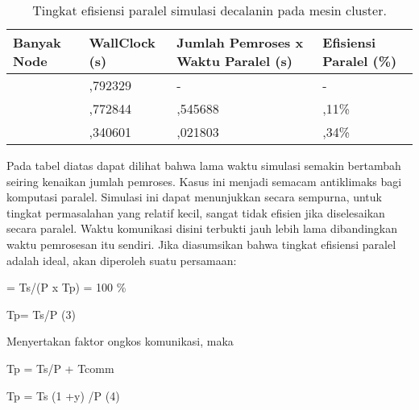 \documentclass[aps,showpacs,pre,floatfix]{revtex4}
\begin{document}
\begin{table}
  \centering


\begin{tabular}{|p{64pt}|p{91pt}|p{91pt}|p{91pt}|}
\hline
\parbox{64pt}{\centering
Banyak Node } & \parbox{91pt}{\centering WallClock (s) } &
\parbox{91pt}{\centering Jumlah Pemroses x Waktu Paralel
(s) } & \parbox{91pt}{\centering Efisiensi Paralel (\%)
} \\
\hline
\parbox{64pt}{
} & \parbox{91pt}{,792329
} & \parbox{91pt}{\centering
-
} & \parbox{91pt}{\centering
-
} \\
\parbox{64pt}{
} & \parbox{91pt}{,772844
} & \parbox{91pt}{,545688
} & \parbox{91pt}{,11\%
} \\
\parbox{64pt}{
} & \parbox{91pt}{,340601
} & \parbox{91pt}{,021803
} & \parbox{91pt}{,34\%
} \\
\hline
\end{tabular}
\caption{Tingkat efisiensi paralel simulasi decalanin pada mesin
cluster.}\label{T4}
\end{table}

Pada tabel diatas dapat dilihat bahwa lama waktu simulasi semakin
bertambah seiring kenaikan jumlah pemroses. Kasus ini menjadi
semacam antiklimaks bagi komputasi paralel. Simulasi ini dapat
menunjukkan secara sempurna, untuk tingkat permasalahan yang
relatif kecil, sangat tidak  efisien jika diselesaikan secara
paralel. Waktu komunikasi disini terbukti jauh lebih lama
dibandingkan waktu pemrosesan itu sendiri. Jika diasumsikan bahwa
tingkat efisiensi paralel adalah ideal, akan diperoleh suatu
persamaan:

\begin{center}

{\footnotesize  = Ts/(P x Tp) = 100 \%}

\end{center}

\begin{center}

{\footnotesize                                    Tp= Ts/P
                                           (3)}

\end{center}


Menyertakan faktor ongkos komunikasi, maka

\begin{center}
{\footnotesize Tp = Ts/P +  Tcomm}
\end{center}
\begin{center}
{\footnotesize Tp = Ts (1 +y) /P (4)}
\end{center}
\end{document}
